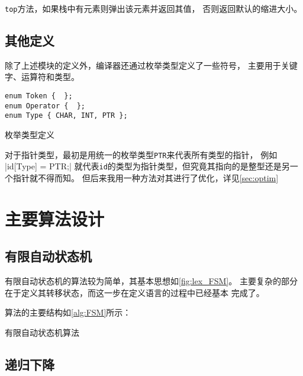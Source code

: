 {\tt top}方法，如果栈中有元素则弹出该元素并返回其值，
否则返回默认的缩进大小。

\subsection{其他定义}\label{subsec:other_definition}

除了上述模块的定义外，编译器还通过枚举类型定义了一些符号，
主要用于关键字、运算符和类型。

\begin{listing}[hbt]
\begin{verbatim}
enum Token {  };
enum Operator {  };
enum Type { CHAR, INT, PTR };
\end{verbatim}
\caption{枚举类型定义}
\end{listing}

对于指针类型，最初是用统一的枚举类型{\tt PTR}来代表所有类型的指针，
例如
|id[Type] = PTR;|
就代表{\tt id}的类型为指针类型，但究竟其指向的是整型还是另一个指针就不得而知。
但后来我用一种方法对其进行了优化，详见\autoref{sec:optim}

\section{主要算法设计}\label{sec:algorithm}

\subsection{有限自动状态机}

有限自动状态机的算法较为简单，其基本思想如\autoref{fig:lex_FSM}。
主要复杂的部分在于定义其转移状态，而这一步在定义语言的过程中已经基本
完成了。

算法的主要结构如\autoref{alg:FSM}所示：

\begin{algorithm}[hbt]
	\caption{有限自动状态机算法}\label{alg:FSM}
	\SetAlgoLined{}

\end{algorithm}

\subsection{递归下降}

